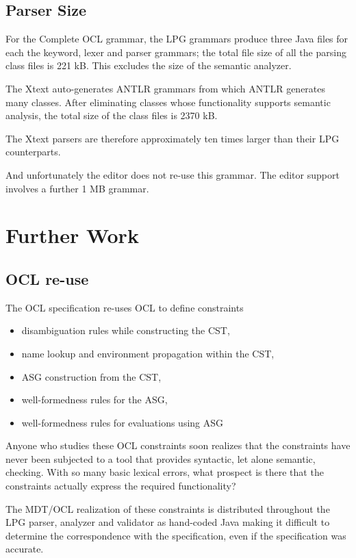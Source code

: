 \documentclass[runningheads,a4paper]{llncs}
\begin{document}
\subsection{Parser Size}

For the Complete OCL grammar, the LPG grammars produce three Java files for each the keyword, lexer and parser grammars; the total file size of all the parsing class files is 221 kB. This excludes the size of the semantic analyzer.

The Xtext auto-generates ANTLR grammars from which ANTLR generates many classes. After eliminating classes whose functionality supports semantic analysis, the total size of the class files is 2370 kB.

The Xtext parsers are therefore approximately ten times larger than their LPG counterparts.

And unfortunately the editor does not re-use this grammar. The editor support involves a further 1 MB grammar.

\section{Further Work}

\subsection{OCL re-use}

The OCL specification re-uses OCL to define constraints
\begin{itemize}
\item disambiguation rules while constructing the CST, 
\item name lookup and environment propagation within the CST, 
\item ASG construction from the CST, 
\item well-formedness rules for the ASG, 
\item well-formedness rules for evaluations using ASG
\end{itemize}

Anyone who studies these OCL constraints soon realizes that the constraints have never been subjected to a tool that provides syntactic, let alone semantic, checking. With so many basic lexical errors, what prospect is there that the constraints actually express the required functionality?

The MDT/OCL realization of these constraints is distributed throughout the LPG parser, analyzer and validator as hand-coded Java making it difficult to determine the correspondence with the specification, even if the specification was accurate.
\end{document}
